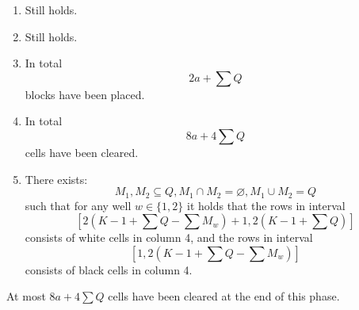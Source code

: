 \begin{enumerate}
\item Still holds.
\item Still holds.
\item In total
\begin{equation*}
    2a + \sum Q
\end{equation*}
blocks have been placed.

\item In total
\begin{equation*}
    8a + 4 \sum Q
\end{equation*}
cells have been cleared.

\item There exists:
\begin{equation*}
    M_1, M_2 \subseteq Q, M_1 \cap M_2 = \varnothing, M_1 \cup M_2 = Q
\end{equation*}
such that for any well $w \in \{1,2\}$ it holds that the rows in interval
\begin{equation*}
        \left[ 2 \left( K-1 + \sum Q - \sum M_w \right) +1, 2 \left( K-1 + \sum Q \right) \right]
    \end{equation*}
consists of white cells in column 4, and the rows in interval
    \begin{equation*}
        \left[ 1, 2 \left( K-1 + \sum Q - \sum M_w \right) \right]
    \end{equation*}
consists of black cells in column 4.

\end{enumerate}

At most $8a + 4 \sum Q$ cells have been cleared at the end of this phase.

